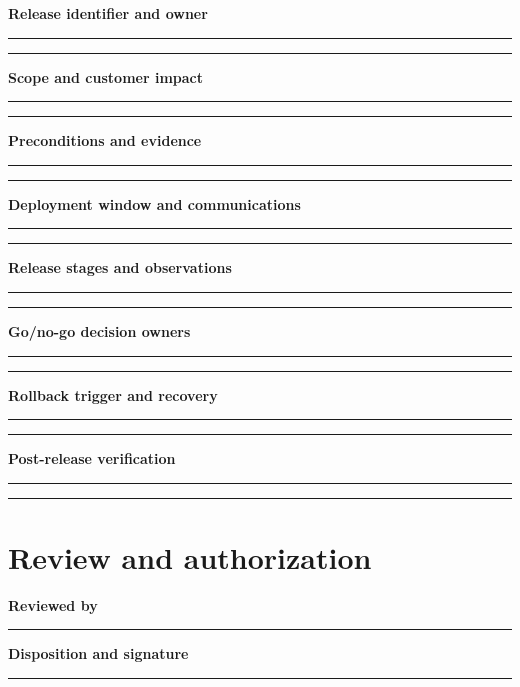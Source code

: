 \documentclass[10pt,letterpaper]{article}
\begin{document}
\textbf{Release identifier and owner}\par
\noindent\rule{\linewidth}{0.35pt}\par\vspace{0.7em}
\noindent\rule{\linewidth}{0.35pt}\par\vspace{0.7em}
\textbf{Scope and customer impact}\par
\noindent\rule{\linewidth}{0.35pt}\par\vspace{0.7em}
\noindent\rule{\linewidth}{0.35pt}\par\vspace{0.7em}
\textbf{Preconditions and evidence}\par
\noindent\rule{\linewidth}{0.35pt}\par\vspace{0.7em}
\noindent\rule{\linewidth}{0.35pt}\par\vspace{0.7em}
\textbf{Deployment window and communications}\par
\noindent\rule{\linewidth}{0.35pt}\par\vspace{0.7em}
\noindent\rule{\linewidth}{0.35pt}\par\vspace{0.7em}
\textbf{Release stages and observations}\par
\noindent\rule{\linewidth}{0.35pt}\par\vspace{0.7em}
\noindent\rule{\linewidth}{0.35pt}\par\vspace{0.7em}
\textbf{Go/no-go decision owners}\par
\noindent\rule{\linewidth}{0.35pt}\par\vspace{0.7em}
\noindent\rule{\linewidth}{0.35pt}\par\vspace{0.7em}
\textbf{Rollback trigger and recovery}\par
\noindent\rule{\linewidth}{0.35pt}\par\vspace{0.7em}
\noindent\rule{\linewidth}{0.35pt}\par\vspace{0.7em}
\textbf{Post-release verification}\par
\noindent\rule{\linewidth}{0.35pt}\par\vspace{0.7em}
\noindent\rule{\linewidth}{0.35pt}\par\vspace{0.7em}
\section{Review and authorization}
\textbf{Reviewed by}\par
\noindent\rule{\linewidth}{0.35pt}\par\vspace{0.7em}
\textbf{Disposition and signature}\par
\noindent\rule{\linewidth}{0.35pt}\par\vspace{0.7em}
\end{document}
